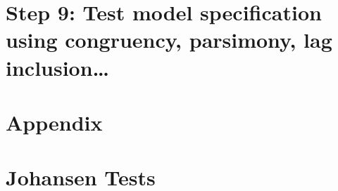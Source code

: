 \documentclass[11pt,preprint, authoryear]{elsarticle}
\numberwithin{equation}{section}
\numberwithin{figure}{section}
\numberwithin{table}{section}
\begin{document}
\hypertarget{step-9-test-model-specification-using-congruency-parsimony-lag-inclusion}{%
\section{Step 9: Test model specification using congruency, parsimony,
lag
inclusion\ldots{}}\label{step-9-test-model-specification-using-congruency-parsimony-lag-inclusion}}

\hypertarget{appendix}{%
\section*{Appendix}\label{appendix}}

\hypertarget{johansen-tests}{%
\section*{Johansen Tests}\label{johansen-tests}}
\end{document}
